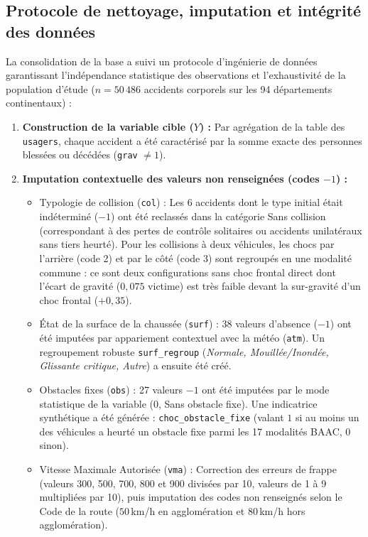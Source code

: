 \documentclass[11pt,a4paper]{article}
\begin{document}
\subsection{Protocole de nettoyage, imputation et intégrité des données}

La consolidation de la base a suivi un protocole d'ingénierie de données garantissant l'indépendance statistique des observations et l'exhaustivité de la population d'étude ($n = 50\,486$ accidents corporels sur les 94 départements continentaux) :

\begin{enumerate}
    \item \textbf{Construction de la variable cible ($Y$) :} Par agrégation de la table des \texttt{usagers}, chaque accident a été caractérisé par la somme exacte des personnes blessées ou décédées (\texttt{grav} $\neq 1$).
    
    \item \textbf{Imputation contextuelle des valeurs non renseignées (codes $-1$) :}
    \begin{itemize}
        \item {Typologie de collision (\texttt{col}) :} Les 6 accidents dont le type initial était indéterminé ($-1$) ont été reclassés dans la catégorie \og Sans collision\fg{} (correspondant à des pertes de contrôle solitaires ou accidents unilatéraux sans tiers heurté). Pour les collisions à deux véhicules, les chocs par l'arrière (code 2) et par le côté (code 3) sont regroupés en une modalité commune : ce sont deux configurations sans choc frontal direct dont l'écart de gravité ($0{,}075$ victime) est très faible devant la sur-gravité d'un choc frontal ($+0{,}35$).
        \item {État de la surface de la chaussée (\texttt{surf}) :} 38 valeurs d'absence ($-1$) ont été imputées par appariement contextuel avec la météo (\texttt{atm}). Un regroupement robuste \texttt{surf\_regroup} (\textit{Normale, Mouillée/Inondée, Glissante critique, Autre}) a ensuite été créé.
        \item {Obstacles fixes (\texttt{obs}) :} 27 valeurs $-1$ ont été imputées par le mode statistique de la variable ($0$, \og Sans obstacle fixe\fg{}). Une indicatrice synthétique a été générée : \texttt{choc\_obstacle\_fixe} (valant $1$ si au moins un des véhicules a heurté un obstacle fixe parmi les 17 modalités BAAC, $0$ sinon).
        \item {Vitesse Maximale Autorisée (\texttt{vma}) :} Correction des erreurs de frappe (valeurs 300, 500, 700, 800 et 900 divisées par 10, valeurs de 1 à 9 multipliées par 10), puis imputation des codes non renseignés selon le Code de la route ($50$\,km/h en agglomération et $80$\,km/h hors agglomération).
    \end{itemize}


\end{enumerate}
\end{document}
